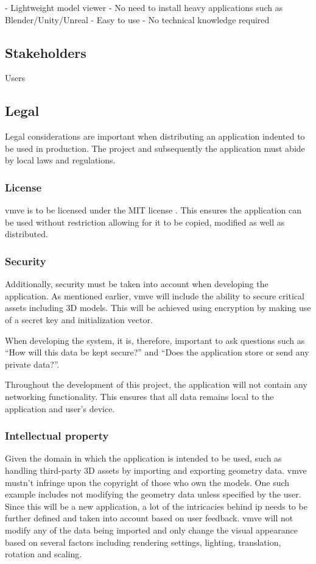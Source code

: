 \documentclass[11pt]{article}
\begin{document}
  - Lightweight model viewer - No need to install heavy
  applications such as Blender/Unity/Unreal - Easy to use - No technical
  knowledge required


\subsection{Stakeholders}
Users



\subsection{Legal}
Legal considerations are important when distributing an application indented to
be used in production. The project and subsequently the application must abide by
local laws and regulations.

\subsubsection{License}
\gls{vmve} is to be licensed under the MIT license \cite{mit}. This ensures the
application can be used without restriction allowing for it to be copied,
modified as well as distributed.

\subsubsection{Security}
Additionally, security must be taken into account when developing the
application. As mentioned earlier, \gls{vmve} will include the ability to secure
critical assets including 3D models. This will be achieved using encryption by
making use of a secret key and initialization vector.

When developing the system, it is, therefore, important to ask questions such as
``How will this data be kept secure?'' and ``Does the application store or send
any private data?''. 

Throughout the development of this project, the application will not contain any
networking functionality. This ensures that all data remains local to the
application and user's device.

\subsubsection{Intellectual property}
Given the domain in which the application is intended to be used, such as
handling third-party 3D assets by importing and exporting geometry data.
\gls{vmve} mustn't infringe upon the copyright of those who own the models. One
such example includes not modifying the geometry data unless specified by the
user. Since this will be a new application, a lot of the intricacies behind
\gls{ip} needs to be further defined and taken into account based on user
feedback. \gls{vmve} will not modify any of the data being imported and only
change the visual appearance based on several factors including rendering
settings, lighting, translation, rotation and scaling. 
\end{document}
